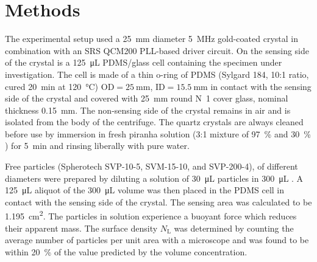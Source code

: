 \documentclass[floatfix,superscriptaddress,a4paper,twocolumn]{revtex4-1}
\begin{document}
\section*{Methods}
\label{sec:materials}
The experimental setup used a \SI{25}{\milli\meter} diameter
\SI{5}{\mega\hertz} gold-coated crystal in combination with an SRS QCM200
PLL-based driver circuit.  On the sensing side of the crystal is a
\SI{125}{\micro\liter} PDMS/glass cell containing the specimen under
investigation.  The cell is made of a thin o-ring of PDMS (Sylgard 184,
10:1 ratio, cured \SI{20}{\minute} at \SI{120}{\celsius})
$\text{OD}=\SI{25}{\milli\meter}$, $\text{ID}=\SI{15.5}{\milli\meter}$ in
contact with the sensing side of the crystal and covered with
\SI{25}{\milli\meter} round N~1
cover glass, nominal thickness \SI{0.15}{\milli\meter}.  The non-sensing
side of the crystal remains in air and is isolated from the body of the
centrifuge.  The quartz crystals are always cleaned before use by immersion
in fresh piranha solution (3:1 mixture of \SI{97}{\percent}  and
\SI{30}{\percent} ) for \SI{5}{\minute} and rinsing liberally with
pure water.

Free particles (Spherotech SVP-10-5, SVM-15-10, and SVP-200-4), of
different diameters were prepared by diluting a solution of
\SI{30}{\micro\liter} particles in \SI{300}{\micro\liter} .  A
\SI{125}{\micro\liter} aliquot of the \SI{300}{\micro\liter} volume was
then placed in the PDMS cell in contact with the sensing side of the
crystal.  The sensing area was calculated to be
\SI{1.195}{\centi\meter\squared}.  The particles in solution experience a
buoyant force which reduces their apparent mass. The surface density
$N_\mathrm{L}$ was determined by counting the average number of particles
per unit area with a microscope and was found to be within
\SI{20}{\percent} of the value predicted by the volume concentration.
\end{document}
